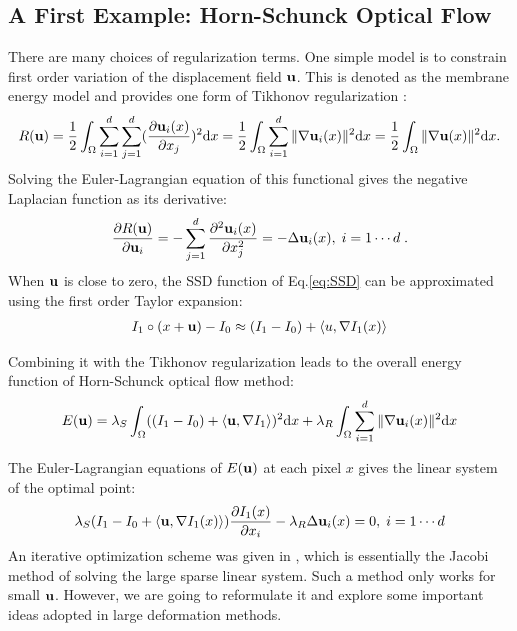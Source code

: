 \documentclass[letterpaper,12pt]{article}
\begin{document}
\subsection{A First Example: Horn-Schunck Optical Flow}
\label{sec:opticalflow}
There are many choices of regularization terms. One simple model is to
constrain first order variation of the displacement field $\mathbf{u}$. This
is denoted as the membrane energy model \cite{Ashburner2007} and
provides one form of Tikhonov regularization \cite{Horn1981}:
\begin{align}
\label{eq:membrane}
R(\mathbf{u}) = \frac{1}{2} \int_\Omega \sum_{i=1}^d\sum_{j=1}^d (\frac{\partial \mathbf{u}_i(x)}{\partial x_j})^2 \text{d} x
= \frac{1}{2} \int_\Omega \sum_{i=1}^d \| \nabla \mathbf{u}_i(x) \|^2 \text{d} x = \frac{1}{2} \int_\Omega \| \nabla\mathbf{u}(x)\|^2 \text{d} x.
\end{align}
Solving the Euler-Lagrangian equation of this functional gives the negative Laplacian function as its derivative:
\begin{align}
\label{eq:membraneEL}
\frac{\partial R(\mathbf{u})}{\partial \mathbf{u}_i} = -  \sum_{j=1}^d \frac{\partial^2 \mathbf{u}_i(x)}{\partial x_j^2} 
= -  \Delta \mathbf{u}_i(x) 
, \; i=1 \cdots d \;.
\end{align}
When $\mathbf{u}$ is close to zero, the SSD function of Eq.\ref{eq:SSD} can be approximated using the first order Taylor expansion:
\begin{align}
I_1 \circ (x + \mathbf{u} ) - I_0 \approx (I_1 - I_0 ) + \langle u, \nabla I_1(x) \rangle
\label{eq:approxopticalflow}
\end{align}

Combining it with the Tikhonov regularization leads to the overall energy function of Horn-Schunck optical flow method: 
\begin{align}
E(\mathbf{u}) = \lambda_S \int_\Omega ((I_1 - I_0 ) + \langle \mathbf{u}, \nabla I_1 \rangle)^2 \text{d} x
+ \lambda_R \int_\Omega \sum_{i=1}^d \| \nabla \mathbf{u}_i(x) \|^2 \text{d} x
\end{align}

The Euler-Lagrangian equations of $E(\mathbf{u})$ at each pixel $x$ gives the linear system of the optimal point:
\begin{align}
\lambda_S (I_1 - I_0  + \langle \mathbf{u}, \nabla I_1(x) \rangle) \frac{\partial I_1(x)}{\partial x_i}
- \lambda_R \Delta \mathbf{u}_i(x) = 0
, \; i=1 \cdots d
\label{eq:opticalflow}
\end{align}
An iterative optimization scheme was given in \cite{Horn1981}, which is essentially the Jacobi method of solving the large sparse linear system. Such a method only works for small $\mathbf{u}$. However, we are going to reformulate it and explore some important ideas adopted in large deformation methods. 
\end{document}

